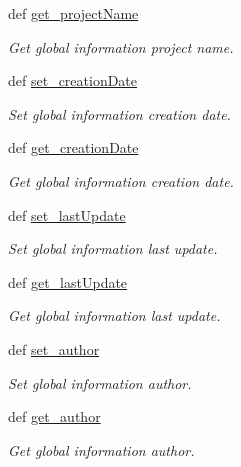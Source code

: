 \begin{DoxyCompactItemize}
def \hyperlink{classlmf_1_1src_1_1core_1_1global__information_1_1_global_information_a41442e2bfc498fb048acd183ab18bcb4}{get\+\_\+project\+Name}
\begin{DoxyCompactList}\small\item\em Get global information project name. \end{DoxyCompactList}\item 
def \hyperlink{classlmf_1_1src_1_1core_1_1global__information_1_1_global_information_a34f23d2fecf02af3cdea7d9e88e9fd09}{set\+\_\+creation\+Date}
\begin{DoxyCompactList}\small\item\em Set global information creation date. \end{DoxyCompactList}\item 
def \hyperlink{classlmf_1_1src_1_1core_1_1global__information_1_1_global_information_a611e859a8104863c3396843c4a58df93}{get\+\_\+creation\+Date}
\begin{DoxyCompactList}\small\item\em Get global information creation date. \end{DoxyCompactList}\item 
def \hyperlink{classlmf_1_1src_1_1core_1_1global__information_1_1_global_information_a90d3b3a8bef7e3c4d30f5e1cbd44bdef}{set\+\_\+last\+Update}
\begin{DoxyCompactList}\small\item\em Set global information last update. \end{DoxyCompactList}\item 
def \hyperlink{classlmf_1_1src_1_1core_1_1global__information_1_1_global_information_afd398454c5b5671dc8c832f2bc04736b}{get\+\_\+last\+Update}
\begin{DoxyCompactList}\small\item\em Get global information last update. \end{DoxyCompactList}\item 
def \hyperlink{classlmf_1_1src_1_1core_1_1global__information_1_1_global_information_a50e23e50d3ad0e6254c94446a829027a}{set\+\_\+author}
\begin{DoxyCompactList}\small\item\em Set global information author. \end{DoxyCompactList}\item 
def \hyperlink{classlmf_1_1src_1_1core_1_1global__information_1_1_global_information_ac689cff94234bacdc6c936cd7bcc2973}{get\+\_\+author}
\begin{DoxyCompactList}\small\item\em Get global information author. \end{DoxyCompactList}\item 

\end{DoxyCompactItemize}

